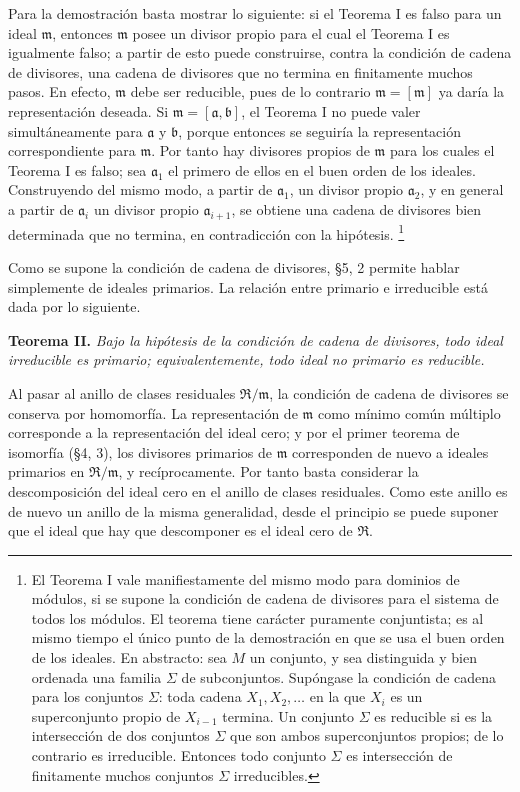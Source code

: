 \documentclass[11pt]{article}
\providecommand{\mR}{\mathfrak{R}}
\providecommand{\ma}{\mathfrak{a}}
\providecommand{\mb}{\mathfrak{b}}
\providecommand{\mm}{\mathfrak{m}}
\begin{document}
Para la demostración basta mostrar lo siguiente: si el Teorema I es falso para un ideal $\mm$, entonces $\mm$ posee un divisor propio para el cual el Teorema I es igualmente falso; a partir de esto puede construirse, contra la condición de cadena de divisores, una cadena de divisores que no termina en finitamente muchos pasos. En efecto, $\mm$ debe ser reducible, pues de lo contrario $\mm=[\mm]$ ya daría la representación deseada. Si $\mm=[\ma,\mb]$, el Teorema I no puede valer simultáneamente para $\ma$ y $\mb$, porque entonces se seguiría la representación correspondiente para $\mm$. Por tanto hay divisores propios de $\mm$ para los cuales el Teorema I es falso; sea $\ma_1$ el primero de ellos en el buen orden de los ideales. Construyendo del mismo modo, a partir de $\ma_1$, un divisor propio $\ma_2$, y en general a partir de $\ma_i$ un divisor propio $\ma_{i+1}$, se obtiene una cadena de divisores bien determinada que no termina, en contradicción con la hipótesis.
\footnote{El Teorema I vale manifiestamente del mismo modo para dominios de módulos, si se supone la condición de cadena de divisores para el sistema de todos los módulos. El teorema tiene carácter puramente conjuntista; es al mismo tiempo el único punto de la demostración en que se usa el buen orden de los ideales. En abstracto: sea $M$ un conjunto, y sea distinguida y bien ordenada una familia $\Sigma$ de subconjuntos. Supóngase la condición de cadena para los conjuntos $\Sigma$: toda cadena $X_1,X_2,\ldots$ en la que $X_i$ es un superconjunto propio de $X_{i-1}$ termina. Un conjunto $\Sigma$ es reducible si es la intersección de dos conjuntos $\Sigma$ que son ambos superconjuntos propios; de lo contrario es irreducible. Entonces todo conjunto $\Sigma$ es intersección de finitamente muchos conjuntos $\Sigma$ irreducibles.}

Como se supone la condición de cadena de divisores, §5, 2 permite hablar simplemente de ideales primarios. La relación entre primario e irreducible está dada por lo siguiente.

\textbf{Teorema II.} \emph{Bajo la hipótesis de la condición de cadena de divisores, todo ideal irreducible es primario; equivalentemente, todo ideal no primario es reducible.}

Al pasar al anillo de clases residuales $\mR/\mm$, la condición de cadena de divisores se conserva por homomorfía. La representación de $\mm$ como mínimo común múltiplo corresponde a la representación del ideal cero; y por el primer teorema de isomorfía (§4, 3), los divisores primarios de $\mm$ corresponden de nuevo a ideales primarios en $\mR/\mm$, y recíprocamente. Por tanto basta considerar la descomposición del ideal cero en el anillo de clases residuales. Como este anillo es de nuevo un anillo de la misma generalidad, desde el principio se puede suponer que el ideal que hay que descomponer es el ideal cero de $\mR$.
\end{document}
